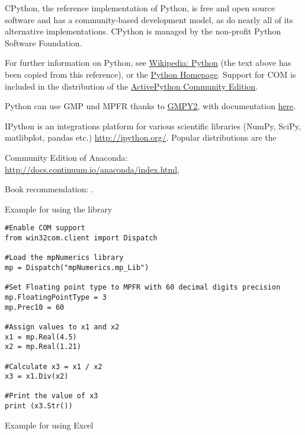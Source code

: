 CPython, the reference implementation of Python, is free and open source software and has a community-based development model, as do nearly all of its alternative implementations. CPython is managed by the non-profit Python Software Foundation.

\vpara
For further information on Python, see \href{http://en.wikipedia.org/wiki/Python_(programming_language)}{Wikipedia: Python} (the text above has been copied from this reference), or the  \href{http://www.python.org/}{Python Homepage}. Support for COM is included in the distribution of the \href{http://www.activestate.com/activepython/downloads}{ActivePython Community Edition}.

\vpara
Python can use  GMP und MPFR thanks to \href{http://code.google.com/p/gmpy/}{GMPY2}, with documentation \href{https://gmpy2.readthedocs.org/en/latest/}{here}.

\vpara
IPython is an integrations platform for various scientific libraries (NumPy, SciPy, matlibplot, pandas etc.) \href{http://ipython.org/}{http://ipython.org/}. Popular distributions are the 

Community Edition of Anaconda: \href{http://docs.continuum.io/anaconda/index.html}{http://docs.continuum.io/anaconda/index.html}, 

%

\vpara
Book recommendation: \cite{McKinney2012}.

\vpara
Example for using the library

\begin{lstlisting}
#Enable COM support
from win32com.client import Dispatch

#Load the mpNumerics library
mp = Dispatch("mpNumerics.mp_Lib")

#Set Floating point type to MPFR with 60 decimal digits precision
mp.FloatingPointType = 3
mp.Prec10 = 60

#Assign values to x1 and x2
x1 = mp.Real(4.5)
x2 = mp.Real(1.21)

#Calculate x3 = x1 / x2
x3 = x1.Div(x2)

#Print the value of x3
print (x3.Str())
\end{lstlisting}

\vpara
Example for using Excel

